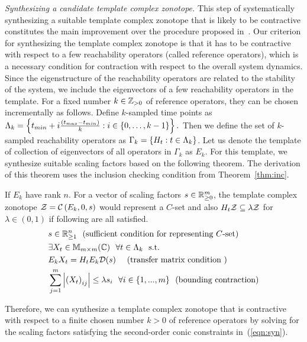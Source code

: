  \emph{Synthesizing a candidate template complex
  zonotope.} This step of systematically synthesizing a suitable
template complex zonotope that is likely to be contractive constitutes
the main improvement over the procedure proposed
in~\cite{arvind2016lis}. Our criterion for synthesizing the template
complex zonotope is that it has to be contractive with respect to a
few reachability operators (called reference operators), which is a
necessary condition for contraction with respect to the overall system
dynamics.  Since the eigenstructure of the reachability operators are
related to the stability of the system, we include the eigenvectors of
a few reachability operators in the template.  For a fixed number
$k\in\mathbb{Z}_{> 0}$ of reference operators, they can be chosen incrementally
as follows.  Define $k$-sampled time points as
$\Lambda_k=\left\{t_{min}+i\frac{(t_{max}-t_{min})}{k}:i\in\{0,\ldots,k-1\}\right\}.$
Then we define the set of $k$-sampled reachability operators as
$\Gamma_k=\left\{H_{t}:t\in\Lambda_k\right\}$.  Let us denote the template
of collection of eigenvectors of all operators in $\Gamma_k$ as $E_k$.
For this template, we synthesize suitable scaling factors based on the
following theorem. The derivation of this theorem uses the inclusion
checking condition from Theorem~\ref{thm:inc}.
%
\begin{thm}
If $E_k$ have rank $n$.  For a
vector of scaling factors $s\in\mathbb{R}^{m}_{\geq 0}$, the template
complex zonotope $\mathcal{Z}=\mathcal{C}\left(E_k,0,s\right)$ would represent a $C$-set and also $H_t\mathcal{Z}\subseteq
\lambda\mathcal{Z}$ for $\lambda\in(0,1)$ if
following are all satisfied.
%
\begin{equation}\label{eqn:syn}
\begin{split}
& s\in\mb{R}^n_{\geq 1}~~\text{(sufficient condition for representing $C$-set)}\\
& \exists X_t\in\mat{m}{m}{C}~~\forall t\in\Lambda_k~~\text{s.t.}\\
& E_kX_t=H_tE_k\dg(s)~~~~(\text{transfer matrix condition
    })\\%
& \sum_{j=1}^m\lt|\lt(X_t\rt)_{ij}\rt|\leq \lambda s_i~~\forall i\in\tup{m}~~\text{(bounding contraction)}\\
\end{split}
\end{equation}
\end{thm}

Therefore, we can synthesize a template complex zonotope that is
contractive with respect to a finite chosen number $k>0$ of reference
operators by solving for the scaling factors satisfying the
second-order conic constraints in~(\ref{eqn:syn}).

